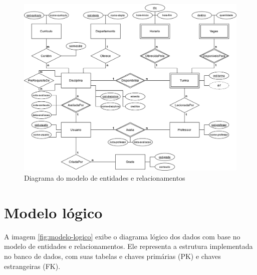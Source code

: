\begin{figure}[ht]
    \begin{center}
    \includegraphics[width=390pt]{figuras/diagrama-er-chen.png}
    \caption{Diagrama do modelo de entidades e relacionamentos}
    \label{fig:diagrama-classes}
    \end{center}
\end{figure}

\section{Modelo lógico}

A imagem \ref{fig:modelo-logico} exibe o diagrama lógico dos dados com base no modelo de entidades e relacionamentos. Ele representa a estrutura implementada no banco de dados, com suas tabelas e chaves primárias (PK) e chaves estrangeiras (FK).

